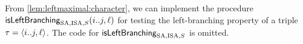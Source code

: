 \documentclass{article}
\begin{document}
From \cref{lem:leftmaximal:character}, we can implement the procedure $\mbox{\textsf{isLeftBranching}}_{{\mathrm{SA}, \mathrm{ISA}, S}}(i..j, \ell)$ for testing the left-branching property of a triple $\tau = \langle i..j, \ell\rangle$. The code for $\mbox{\textsf{isLeftBranching}}_{{\mathrm{SA}, \mathrm{ISA}, S}}$ is omitted. 










\end{document}
